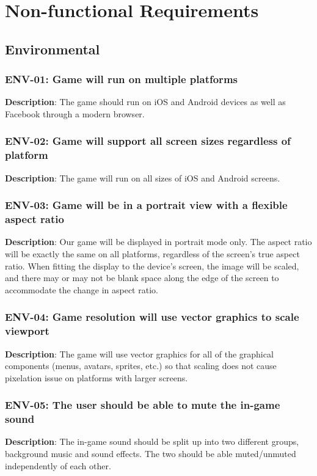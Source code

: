 \chapter{Non-functional Requirements}

\section{Environmental}

\subsection{ENV-01: Game will run on multiple platforms}
\textbf{Description}: The game should run on iOS and Android devices as well
as Facebook through a modern browser.

\subsection{ENV-02: Game will support all screen sizes regardless of platform}
\textbf{Description}: The game will run on all sizes of iOS and Android screens.

\subsection{ENV-03: Game will be in a portrait view with a flexible aspect ratio}
\textbf{Description}: Our game will be displayed in portrait mode only. The
aspect ratio will be exactly the same on all platforms, regardless
of the screen\textquoteright{}s true aspect ratio. When fitting the
display to the device\textquoteright{}s screen, the image will be
scaled, and there may or may not be blank space along the edge of
the screen to accommodate the change in aspect ratio.

\subsection{ENV-04: Game resolution will use vector graphics to scale viewport}
\textbf{Description}: The game will use vector graphics for all of
the graphical components (menus, avatars, sprites, etc.) so that scaling
does not cause pixelation issue on platforms with larger screens. 

\subsection{ENV-05: The user should be able to mute the in-game sound }
\textbf{Description}: The in-game sound should be split up into two different
groups, background music and sound effects. The two should be able
muted/unmuted independently of each other.

